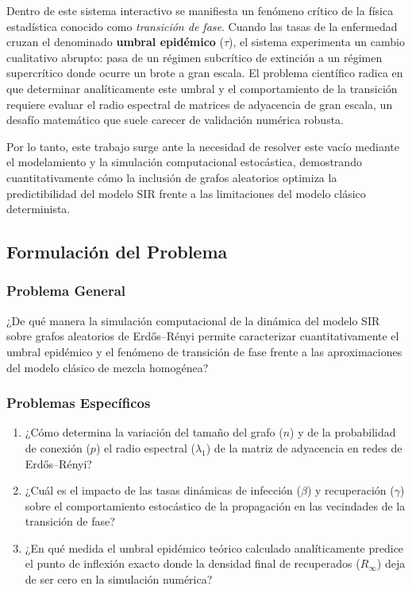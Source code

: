 \documentclass[12pt]{article}
\begin{document}
Dentro de este sistema interactivo se manifiesta un fenómeno crítico de la física estadística conocido como \textit{transición de fase}. Cuando las tasas de la enfermedad cruzan el denominado \textbf{umbral epidémico} ($\tau$), el sistema experimenta un cambio cualitativo abrupto: pasa de un régimen subcrítico de extinción a un régimen supercrítico donde ocurre un brote a gran escala. El problema científico radica en que determinar analíticamente este umbral y el comportamiento de la transición requiere evaluar el radio espectral de matrices de adyacencia de gran escala, un desafío matemático que suele carecer de validación numérica robusta. 

Por lo tanto, este trabajo surge ante la necesidad de resolver este vacío mediante el modelamiento y la simulación computacional estocástica, demostrando cuantitativamente cómo la inclusión de grafos aleatorios optimiza la predictibilidad del modelo SIR frente a las limitaciones del modelo clásico determinista.

\subsection{Formulación del Problema}

\subsubsection{Problema General}
¿De qué manera la simulación computacional de la dinámica del modelo SIR sobre grafos aleatorios de Erdős–Rényi permite caracterizar cuantitativamente el umbral epidémico y el fenómeno de transición de fase frente a las aproximaciones del modelo clásico de mezcla homogénea?

\subsubsection{Problemas Específicos}
\begin{enumerate}
    \item ¿Cómo determina la variación del tamaño del grafo ($n$) y de la probabilidad de conexión ($p$) el radio espectral ($\lambda_1$) de la matriz de adyacencia en redes de Erdős–Rényi?
    \item ¿Cuál es el impacto de las tasas dinámicas de infección ($\beta$) y recuperación ($\gamma$) sobre el comportamiento estocástico de la propagación en las vecindades de la transición de fase?
    \item ¿En qué medida el umbral epidémico teórico calculado analíticamente predice el punto de inflexión exacto donde la densidad final de recuperados ($R_\infty$) deja de ser cero en la simulación numérica?
\end{enumerate}
\end{document}
